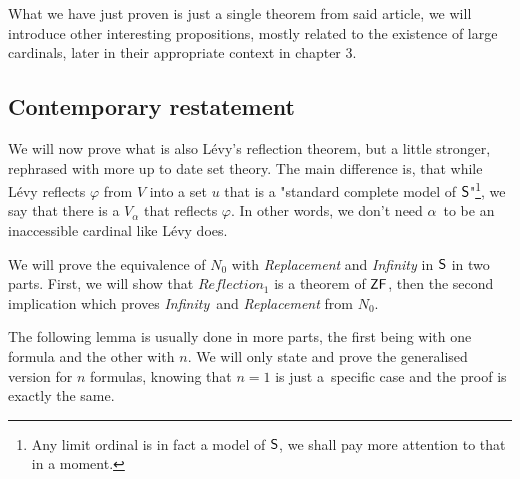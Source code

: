 \documentclass[12pt,a4paper]{article}
\begin{document}
What we have just proven is just a single theorem from said article, we will introduce other interesting propositions, mostly related to the existence of large cardinals, later in their appropriate context in chapter 3.

\subsection{Contemporary restatement}
We will now prove what is also Lévy's reflection theorem, but a little stronger, rephrased with more up to date set theory. The main difference is, that while Lévy reflects $\varphi$ from $V$ into a set $u$ that is a "standard complete model of $\sf{S}$"\footnote{Any limit ordinal is in fact a model of $\sf{S}$, we shall pay more attention to that in a moment.}, we say that there is a $V_\alpha$ that reflects $\varphi$. In other words, we don't need $\alpha$ to be an inaccessible cardinal like Lévy does.

We will prove the equivalence of $N_0$ with \emph{Replacement} and \emph{Infinity} in $\sf{S}$ in two parts. First, we will show that \emph{$Reflection_1$} is a theorem of $\sf{ZF}$, then the second implication which proves \emph{Infinity} and \emph{Replacement} from $N_0$.

The following lemma is usually done in more parts, the first being with one formula and the other with $n$. We will only state and prove the generalised version for $n$ formulas, knowing that $n=1$ is just a~specific case and the proof is exactly the same.

\end{document}
